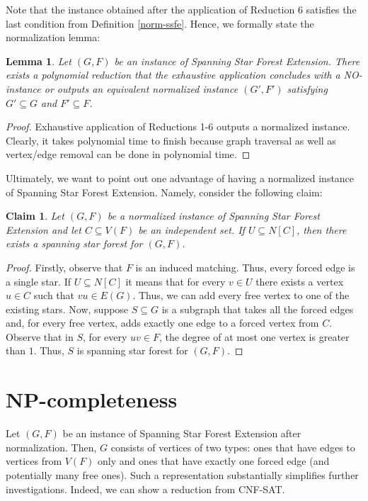 \documentclass[en]{pracamgr}
\newtheorem{lemma}{Lemma}
\newtheorem{claim}{Claim}
\newcommand{\ssfep}{{\sc Spanning Star Forest Extension}}
\newcommand{\cnfsat}{{\sc CNF-SAT}}
\begin{document}
Note that the instance obtained after the application of Reduction 6 satisfies the last condition from Definition \ref{norm-ssfe}. Hence, we formally state the normalization lemma:

\begin{lemma}
	Let $(G,F)$ be an instance of \ssfep{}. There exists a polynomial reduction that the exhaustive application concludes with a NO-instance or outputs an equivalent normalized instance $(G',F')$ satisfying $G' \subseteq G$ and $F' \subseteq F$.
\end{lemma}

\begin{proof}
	Exhaustive application of Reductions 1-6 outputs a normalized instance. Clearly, it takes polynomial time to finish because graph traversal as well as vertex/edge removal can be done in polynomial time.
\end{proof}

Ultimately, we want to point out one advantage of having a normalized instance of \ssfep{}. Namely, consider the following claim:

\begin{claim}
	Let $(G,F)$ be a normalized instance of \ssfep{} and let $C \subseteq V(F)$ be an independent set. If $U \subseteq N[C]$, then there exists a spanning star forest for $(G,F)$.
\end{claim}

\begin{proof}
	Firstly, observe that $F$ is an induced matching. Thus, every forced edge is a single star. If $U \subseteq N[C]$ it means that for every $v \in U$ there exists a vertex $u \in C$ such that $vu \in E(G)$. Thus, we can add every free vertex to one of the existing stars. Now, suppose $S \subseteq G$ is a subgraph that takes all the forced edges and, for every free vertex, adds exactly one edge to a forced vertex from $C$. Observe that in $S$, for every $uv \in F$, the degree of at most one vertex is greater than $1$. Thus, $S$ is spanning star forest for $(G,F)$.
\end{proof}

\section{NP-completeness}

Let $(G,F)$ be an instance of \ssfep{} after normalization. Then, $G$ consists of vertices of two types: ones that have edges to vertices from $V(F)$ only and ones that have exactly one forced edge (and potentially many free ones). Such a representation substantially simplifies further investigations. Indeed, we can show a reduction from \cnfsat{}.
\end{document}

